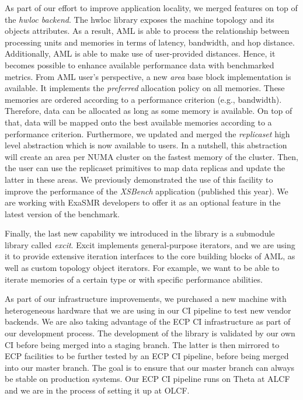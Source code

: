 As part of our effort to improve application locality, we merged
features on top of the \emph{hwloc backend}. The hwloc library exposes the machine
topology and its objects attributes. As a result, AML is able
to process the relationship between processing units and memories in
terms of latency, bandwidth, and hop distance. Additionally, AML is
able to make use of user-provided distances. Hence, it becomes
possible to enhance available performance data with benchmarked metrics.
From AML user's perspective, a new \emph{area} base block implementation
is available. It implements the \emph{preferred} allocation policy on all
memories. These memories are ordered according to a performance
criterion (e.g., bandwidth). Therefore, data can be allocated as long as
some memory is available. On top of that, data will be mapped onto the best
available memories according to a performance criterion. Furthermore,
we updated and merged the \emph{replicaset} high level abstraction which
is now available to users. In a nutshell, this abstraction will
create an area per NUMA cluster on the fastest memory of the cluster.
Then, the user can use the replicaset primitives to map data replicas
and update the latter in these areas. We previously demonstrated the use of
this facility to improve the performance of the
\emph{XSBench} application (published this year). We are working with
ExaSMR developers to offer it as an optional feature in the latest version
of the benchmark. 

Finally, the last new capability we introduced in the library is a submodule
library called \emph{excit}. Excit implements general-purpose iterators, and we
are using it to provide extensive iteration interfaces to the core building blocks
of AML, as well as custom topology object iterators. For example, we want to be
able to iterate memories of a certain type or with specific performance
abilities.

As part of our infrastructure improvements, we purchased a new machine
with heterogeneous hardware that we are using in our CI pipeline
to test new vendor backends. We are also taking advantage of the ECP CI
infrastructure as part of our development process. The development of the
library is validated by our own CI before being merged into a staging
branch. The latter is then mirrored to ECP facilities to be further tested by
an ECP CI pipeline, before being merged into our master branch. The goal is to
ensure that our master branch can always be stable on production systems. Our
ECP CI pipeline runs on Theta at ALCF and we are in the process of setting it
up at OLCF.

